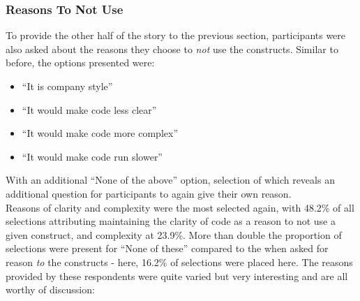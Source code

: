 \documentclass{article}
\begin{document}
        \subsubsection{Reasons To Not Use}
            To provide the other half of the story to the previous section, participants were also asked about the reasons they choose to \emph{not} use the constructs. Similar to before, the options presented were:
            \begin{itemize}
                \item ``It is company style''
                \item ``It would make code less clear''
                \item ``It would make code more complex''
                \item ``It would make code run slower''
            \end{itemize}
            With an additional ``None of the above'' option, selection of which reveals an additional question for participants to again give their own reason.
            \\

            Reasons of clarity and complexity were the most selected again, with 48.2\% of all selections attributing maintaining the clarity of code as a reason to not use a given construct, and complexity at 23.9\%. More than double the proportion of selections were present for ``None of these'' compared to the when asked for reason \emph{to} the constructs - here, 16.2\% of selections were placed here. The reasons provided by these respondents were quite varied but very interesting and are all worthy of discussion:
\end{document}
